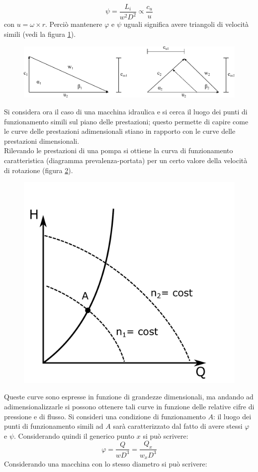 \begin{equation}
\psi = \frac{L_i}{w^2 D^2} \propto \frac{c_u}{u}
\end{equation}
con $u= \omega \times r$. Perciò mantenere $\varphi$ e $\psi$ uguali significa avere triangoli di velocità simili (vedi la figura \ref{fig:tria}).
\begin{figure}
\centering
  \includegraphics[width=.8\textwidth]{fig/triang.pdf}
\caption{}
\label{fig:tria}
\end{figure}

Si considera ora il caso di una macchina idraulica e si cerca il luogo dei punti di funzionamento simili sul piano delle prestazioni; questo permette di capire come le curve delle prestazioni adimensionali stiano in rapporto con le curve delle prestazioni dimensionali.\\
Rilevando le prestazioni di una pompa si ottiene la curva di funzionamento caratteristica (diagramma prevalenza-portata) per un certo valore della velocità di rotazione (figura \ref{fig:hq}).
\begin{figure}[h!]
\centering
  \includegraphics[width=.3\textwidth]{fig/hq.pdf}
\caption{}
\label{fig:hq}
\end{figure}
Queste curve sono espresse in funzione di grandezze dimensionali, ma andando ad adimensionalizzarle si possono ottenere tali curve in funzione delle relative cifre di pressione e di flusso. Si consideri una condizione di funzionamento $A$: il luogo dei punti di funzionamento simili ad $A$ sarà caratterizzato dal fatto di avere stessi $\varphi$ e $\psi$. Considerando quindi il generico punto $x$ si può scrivere:
\begin{equation}
\varphi = \frac{Q}{w D^3}= \frac{Q_x}{w_x D^3}
\end{equation}
Considerando una macchina con lo stesso diametro si può scrivere:
